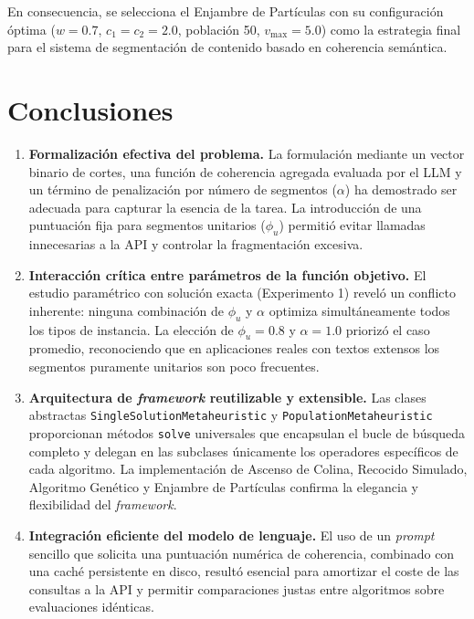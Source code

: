 \documentclass[letterpaper, 12pt]{report}
\begin{document}
En consecuencia, se selecciona el Enjambre de Partículas con su configuración óptima (\(w=0.7\), \(c_1=c_2=2.0\), población 50, \(v_{\max}=5.0\)) como la estrategia final para el sistema de segmentación de contenido basado en coherencia semántica.



\chapter{Conclusiones}

\begin{enumerate}
    \item \textbf{Formalización efectiva del problema.} 
    La formulación mediante un vector binario de cortes, una función de coherencia agregada evaluada por el LLM y un término de penalización por número de segmentos ($\alpha$) ha demostrado ser adecuada para capturar la esencia de la tarea. La introducción de una puntuación fija para segmentos unitarios ($\phi_u$) permitió evitar llamadas innecesarias a la API y controlar la fragmentación excesiva.
    
    \item \textbf{Interacción crítica entre parámetros de la función objetivo.}
    El estudio paramétrico con solución exacta (Experimento 1) reveló un conflicto inherente: ninguna combinación de $\phi_u$ y $\alpha$ optimiza simultáneamente todos los tipos de instancia. La elección de $\phi_u = 0.8$ y $\alpha = 1.0$ priorizó el caso promedio, reconociendo que en aplicaciones reales con textos extensos los segmentos puramente unitarios son poco frecuentes. 
    
    \item \textbf{Arquitectura de \textit{framework} reutilizable y extensible.}
    Las clases abstractas \texttt{SingleSolutionMetaheuristic} y \texttt{PopulationMetaheuristic} proporcionan métodos \texttt{solve} universales que encapsulan el bucle de búsqueda completo y delegan en las subclases únicamente los operadores específicos de cada algoritmo. La implementación de Ascenso de Colina, Recocido Simulado, Algoritmo Genético y Enjambre de Partículas confirma la elegancia y flexibilidad del \textit{framework}.
    
    \item \textbf{Integración eficiente del modelo de lenguaje.}
    El uso de un \textit{prompt} sencillo que solicita una puntuación numérica de coherencia, combinado con una caché persistente en disco, resultó esencial para amortizar el coste de las consultas a la API y permitir comparaciones justas entre algoritmos sobre evaluaciones idénticas. 
    

\end{enumerate}
\end{document}
